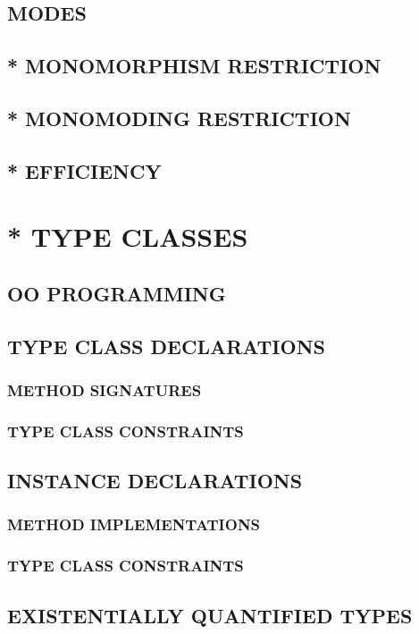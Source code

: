\documentclass[a4paper,11pt,notitlepage,onecolumn]{article}
\begin{document}
\subsection{MODES}
\subsection{* MONOMORPHISM RESTRICTION}
\subsection{* MONOMODING RESTRICTION}
\subsection{* EFFICIENCY}



\section{* TYPE CLASSES}
\subsection{OO PROGRAMMING}
\subsection{TYPE CLASS DECLARATIONS}
\subsubsection{METHOD SIGNATURES}
\subsubsection{TYPE CLASS CONSTRAINTS}
\subsection{INSTANCE DECLARATIONS}
\subsubsection{METHOD IMPLEMENTATIONS}
\subsubsection{TYPE CLASS CONSTRAINTS}
\subsection{EXISTENTIALLY QUANTIFIED TYPES}
\end{document}
